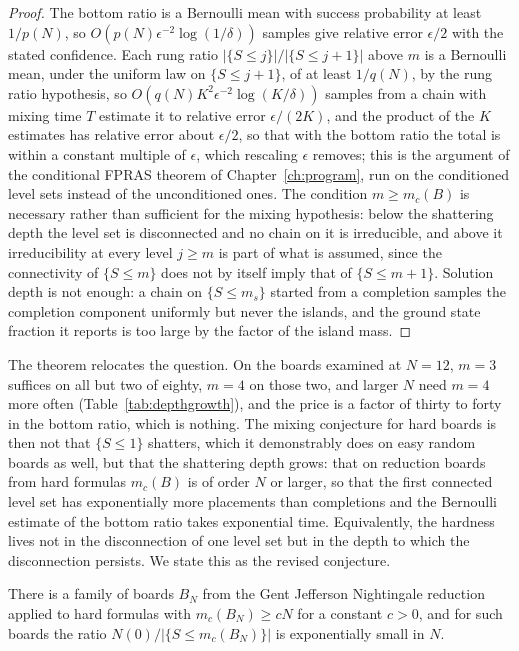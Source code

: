 \begin{proof}
The bottom ratio is a Bernoulli mean with success probability at least $1/p(N)$, so $O(p(N) \epsilon^{-2} \log (1/\delta))$ samples give relative error $\epsilon / 2$ with the stated confidence. Each rung ratio $|\{ S \le j \}| / |\{ S \le j + 1 \}|$ above $m$ is a Bernoulli mean, under the uniform law on $\{ S \le j + 1 \}$, of at least $1/q(N)$, by the rung ratio hypothesis, so $O(q(N) K^2 \epsilon^{-2} \log (K/\delta))$ samples from a chain with mixing time $T$ estimate it to relative error $\epsilon / (2K)$, and the product of the $K$ estimates has relative error about $\epsilon / 2$, so that with the bottom ratio the total is within a constant multiple of $\epsilon$, which rescaling $\epsilon$ removes; this is the argument of the conditional FPRAS theorem of Chapter~\ref{ch:program}, run on the conditioned level sets instead of the unconditioned ones. The condition $m \ge m_c(B)$ is necessary rather than sufficient for the mixing hypothesis: below the shattering depth the level set is disconnected and no chain on it is irreducible, and above it irreducibility at every level $j \ge m$ is part of what is assumed, since the connectivity of $\{ S \le m \}$ does not by itself imply that of $\{ S \le m + 1 \}$. Solution depth is not enough: a chain on $\{ S \le m_s \}$ started from a completion samples the completion component uniformly but never the islands, and the ground state fraction it reports is too large by the factor of the island mass.
\end{proof}

The theorem relocates the question. On the boards examined at $N = 12$, $m = 3$ suffices on all but two of eighty, $m = 4$ on those two, and larger $N$ need $m = 4$ more often (Table~\ref{tab:depthgrowth}), and the price is a factor of thirty to forty in the bottom ratio, which is nothing. The mixing conjecture for hard boards is then not that $\{ S \le 1 \}$ shatters, which it demonstrably does on easy random boards as well, but that the shattering depth grows: that on reduction boards from hard formulas $m_c(B)$ is of order $N$ or larger, so that the first connected level set has exponentially more placements than completions and the Bernoulli estimate of the bottom ratio takes exponential time. Equivalently, the hardness lives not in the disconnection of one level set but in the depth to which the disconnection persists. We state this as the revised conjecture.

\begin{conjecture}
\label{conj:shatterdepth}
There is a family of boards $B_N$ from the Gent Jefferson Nightingale reduction applied to hard formulas with $m_c(B_N) \ge c N$ for a constant $c > 0$, and for such boards the ratio $N(0) / |\{ S \le m_c(B_N) \}|$ is exponentially small in $N$.
\end{conjecture}

